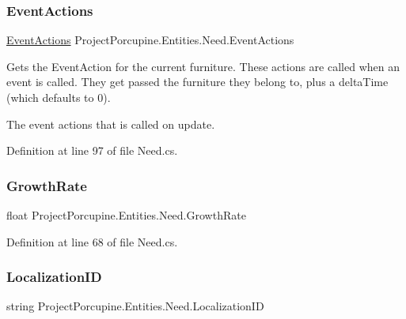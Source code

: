 \subsubsection{\texorpdfstring{Event\+Actions}{EventActions}}
{\footnotesize\ttfamily \hyperlink{class_event_actions}{Event\+Actions} Project\+Porcupine.\+Entities.\+Need.\+Event\+Actions\hspace{0.3cm}{\ttfamily [get]}}



Gets the Event\+Action for the current furniture. These actions are called when an event is called. They get passed the furniture they belong to, plus a delta\+Time (which defaults to 0). 

The event actions that is called on update.

Definition at line 97 of file Need.\+cs.

\mbox{\label{class_project_porcupine_1_1_entities_1_1_need_a3cda999c9c674956713f5644a9dc2609}} 
\subsubsection{\texorpdfstring{Growth\+Rate}{GrowthRate}}
{\footnotesize\ttfamily float Project\+Porcupine.\+Entities.\+Need.\+Growth\+Rate\hspace{0.3cm}{\ttfamily [get]}}



Definition at line 68 of file Need.\+cs.

\mbox{\label{class_project_porcupine_1_1_entities_1_1_need_a06818f5451bf2eee85bc3b141b741fea}} 
\subsubsection{\texorpdfstring{Localization\+ID}{LocalizationID}}
{\footnotesize\ttfamily string Project\+Porcupine.\+Entities.\+Need.\+Localization\+ID\hspace{0.3cm}{\ttfamily [get]}}



